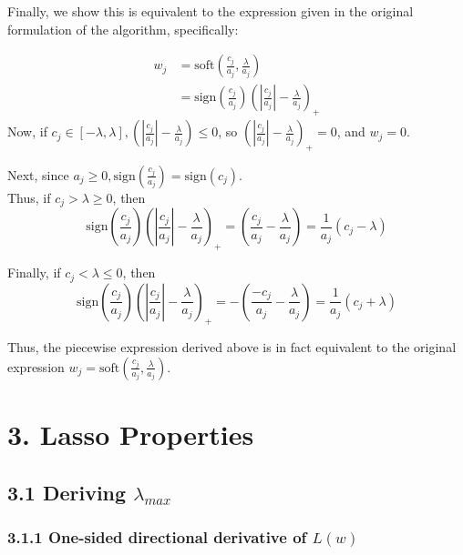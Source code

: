 \documentclass[paper=a4, fontsize=11pt]{scrartcl} %
\numberwithin{equation}{section} %
\numberwithin{figure}{section} %
\numberwithin{table}{section} %
\begin{document}
Finally, we show this is equivalent to the expression given in the original formulation of the algorithm, specifically:

\begin{align*}
w_j &= \textrm{soft}\left(\frac{c_j}{a_j}, \frac{\lambda}{a_j}\right) \\
	&= \textrm{sign}\left(\frac{c_j}{a_j}\right)\left(\left|\frac{c_j}{a_j}\right| - \frac{\lambda}{a_j}\right)_+
\end{align*}
Now, if $c_j \in [-\lambda, \lambda],\left(\left|\frac{c_j}{a_j}\right| - \frac{\lambda}{a_j}\right) \leq 0$, so $\left(\left|\frac{c_j}{a_j}\right| - \frac{\lambda}{a_j}\right)_+ = 0$, and $w_j = 0$.

Next, since $a_j \geq 0,  \textrm{sign}\left(\frac{c_j}{a_j}\right) =  \textrm{sign}(c_j)$. \\

Thus, if $c_j > \lambda \geq 0$, then
\[\textrm{sign}\left(\frac{c_j}{a_j}\right)\left(\left|\frac{c_j}{a_j}\right| - \frac{\lambda}{a_j}\right)_+ = \left(\frac{c_j}{a_j} - \frac{\lambda}{a_j}\right) = \frac{1}{a_j}(c_j - \lambda)\]

Finally, if $c_j < \lambda \leq 0$, then
\[\textrm{sign}\left(\frac{c_j}{a_j}\right)\left(\left|\frac{c_j}{a_j}\right| - \frac{\lambda}{a_j}\right)_+ = - \left(\frac{-c_j}{a_j} - \frac{\lambda}{a_j}\right) = \frac{1}{a_j}(c_j + \lambda)\]

Thus, the piecewise expression derived above is in fact equivalent to the original expression $w_j = \textrm{soft}\left(\frac{c_j}{a_j}, \frac{\lambda}{a_j}\right)$.


\section*{3. Lasso Properties}

\subsection*{3.1 Deriving $\lambda_{max}$}

\subsubsection*{3.1.1 One-sided directional derivative of $L(w)$}
\end{document}
